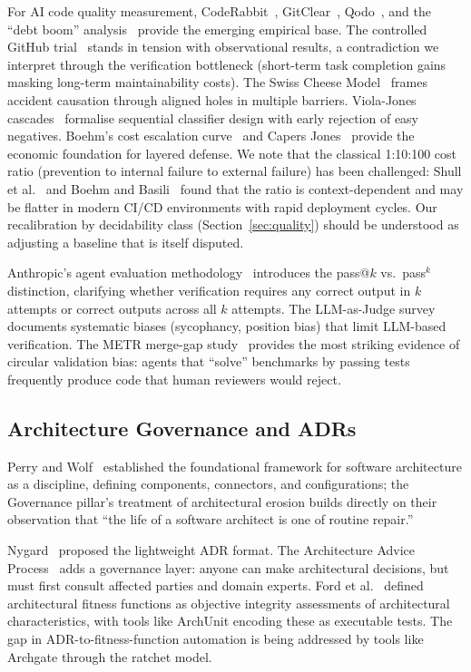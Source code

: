 \documentclass[11pt, a4paper, logo, copyright]{googledeepmind}
\begin{document}
For AI code quality measurement, CodeRabbit~\citep{coderabbit2025}, GitClear~\citep{gitclear2025}, Qodo~\citep{qodo2025}, and the ``debt boom'' analysis~\citep{debtboom2026} provide the emerging empirical base. The controlled GitHub trial~\citep{github2024rct} stands in tension with observational results, a contradiction we interpret through the verification bottleneck (short-term task completion gains masking long-term maintainability costs). The Swiss Cheese Model~\citep{reason1990} frames accident causation through aligned holes in multiple barriers. Viola-Jones cascades~\citep{violajones2004} formalise sequential classifier design with early rejection of easy negatives. Boehm's cost escalation curve~\citep{boehm1981} and Capers Jones~\citep{capersjones2012} provide the economic foundation for layered defense. We note that the classical 1:10:100 cost ratio (prevention to internal failure to external failure) has been challenged: Shull et al.~\citep{shull2002} and Boehm and Basili~\citep{boehm2001} found that the ratio is context-dependent and may be flatter in modern CI/CD environments with rapid deployment cycles. Our recalibration by decidability class (Section~\ref{sec:quality}) should be understood as adjusting a baseline that is itself disputed.

Anthropic's agent evaluation methodology~\citep{anthropic2026evals} introduces the pass@$k$ vs.\ pass$^k$ distinction, clarifying whether verification requires any correct output in $k$ attempts or correct outputs across all $k$ attempts. The LLM-as-Judge survey~\citep{li2024survey} documents systematic biases (sycophancy, position bias) that limit LLM-based verification. The METR merge-gap study~\citep{metr2026swebench} provides the most striking evidence of circular validation bias: agents that ``solve'' benchmarks by passing tests frequently produce code that human reviewers would reject.


\subsection{Architecture Governance and ADRs}

Perry and Wolf~\citep{perry1992} established the foundational framework for software architecture as a discipline, defining components, connectors, and configurations; the Governance pillar's treatment of architectural erosion builds directly on their observation that ``the life of a software architect is one of routine repair.''

Nygard~\citep{nygard2011} proposed the lightweight ADR format. The Architecture Advice Process~\citep{harmellaw2023} adds a governance layer: anyone can make architectural decisions, but must first consult affected parties and domain experts. Ford et al.~\citep{ford2017} defined architectural fitness functions as objective integrity assessments of architectural characteristics, with tools like ArchUnit encoding these as executable tests. The gap in ADR-to-fitness-function automation is being addressed by tools like Archgate through the ratchet model.
\end{document}
